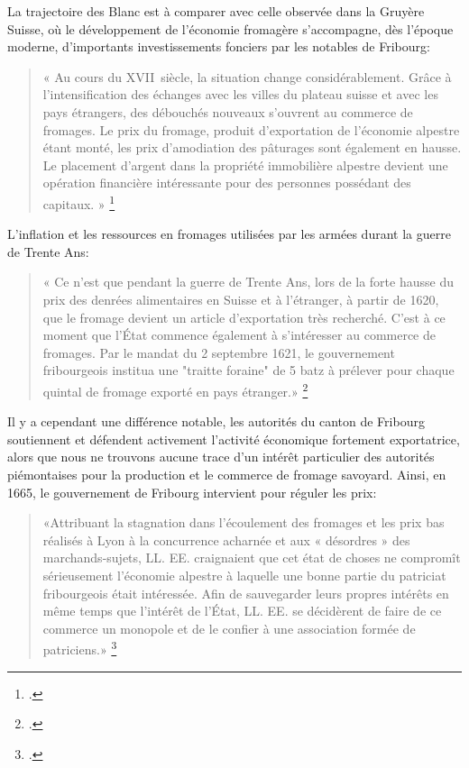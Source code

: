 \documentclass[12pt,a4paper]{report}
\begin{document}
	La trajectoire des Blanc est à comparer avec celle observée dans la Gruyère Suisse, où le développement de l'économie fromagère s'accompagne, dès l'époque moderne, d'importants investissements fonciers par les notables de Fribourg: \begin{quote}
		« Au cours du XVII\ieme\ siècle, la situation change considérablement. Grâce à l'intensification des échanges avec les villes du plateau suisse et avec les pays étrangers, des débouchés nouveaux s'ouvrent au commerce de fromages. Le prix du fromage, produit d'exportation de l'économie alpestre étant monté, les prix d'amodiation des pâturages sont également en hausse. Le placement d'argent dans la propriété immobilière alpestre devient une opération financière intéressante pour des personnes possédant des capitaux. »
		\footcite[44]{RuffieuxBodmer1972HistoireGruyere}
	\end{quote}
	 L'inflation et les ressources en fromages utilisées par les armées durant la guerre de Trente Ans: 
	 \begin{quote}
	 	« Ce n'est que pendant la guerre de Trente Ans, lors de la forte hausse du prix des denrées alimentaires en Suisse et à l'étranger, à partir de 1620, que le fromage devient un article d'exportation très recherché. C'est à ce moment que l'État commence également à s'intéresser au commerce de fromages. Par le mandat du 2 septembre 1621, le gouvernement fribourgeois institua une "traitte foraine" de 5 batz à prélever pour chaque quintal de fromage exporté en pays étranger.»
	 	\footcite[60]{RuffieuxBodmer1972HistoireGruyere}
	 \end{quote} 
	Il y a cependant une différence notable, les autorités du canton de Fribourg soutiennent et défendent activement l'activité économique fortement exportatrice, alors que nous ne trouvons aucune trace d'un intérêt particulier des autorités piémontaises pour la production et le commerce de fromage savoyard. 
	Ainsi, en 1665, le gouvernement de Fribourg intervient pour réguler les prix:
	 \begin{quote}
	 	«Attribuant la stagnation dans l'écoulement des fromages et les prix bas réalisés à Lyon à la concurrence acharnée et aux « désordres » des marchands-sujets, LL. EE. craignaient que cet état de choses ne compromît sérieusement l'économie alpestre à laquelle une bonne partie du patriciat fribourgeois était intéressée. Afin de sauvegarder leurs propres intérêts en même temps que l'intérêt de l'État, LL. EE. se décidèrent de faire de ce commerce un monopole et de le confier à une association formée de patriciens.»
	 	\footcite[159]{RuffieuxBodmer1972HistoireGruyere}
	 \end{quote}
	 
\end{document}
